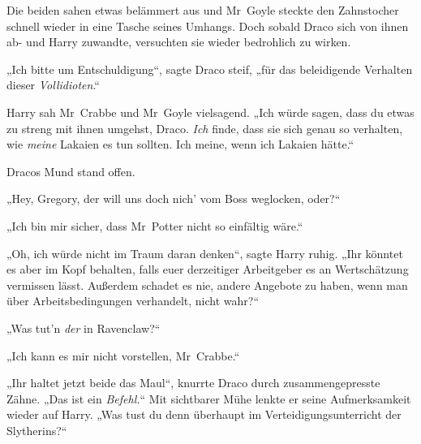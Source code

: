 Die beiden sahen etwas belämmert aus und Mr~Goyle steckte den Zahnstocher schnell wieder in eine Tasche seines Umhangs. Doch sobald Draco sich von ihnen ab- und Harry zuwandte, versuchten sie wieder bedrohlich zu wirken.

„Ich bitte um Entschuldigung“, sagte Draco steif, „für das beleidigende Verhalten dieser \emph{Vollidioten}.“

Harry sah Mr~Crabbe und Mr~Goyle vielsagend. „Ich würde sagen, dass du etwas zu streng mit ihnen umgehst, Draco. \emph{Ich} finde, dass sie sich genau so verhalten, wie \emph{meine} Lakaien es tun sollten. Ich meine, wenn ich Lakaien hätte.“

Dracos Mund stand offen.

„Hey, Gregory, der will uns doch nich’ vom Boss weglocken, oder?“

„Ich bin mir sicher, dass Mr~Potter nicht so einfältig wäre.“

„Oh, ich würde nicht im Traum daran denken“, sagte Harry ruhig. „Ihr könntet es aber im Kopf behalten, falls euer derzeitiger Arbeitgeber es an Wertschätzung vermissen lässt. Außerdem schadet es nie, andere Angebote zu haben, wenn man über Arbeitsbedingungen verhandelt, nicht wahr?“

„Was tut’n \emph{der} in Ravenclaw?“

„Ich kann es mir nicht vorstellen, Mr~Crabbe.“

„Ihr haltet jetzt beide das Maul“, knurrte Draco durch zusammengepresste Zähne. „Das ist ein \emph{Befehl.}“ Mit sichtbarer Mühe lenkte er seine Aufmerksamkeit wieder auf Harry. „Was tust du denn überhaupt im Verteidigungsunterricht der Slytherins?“

